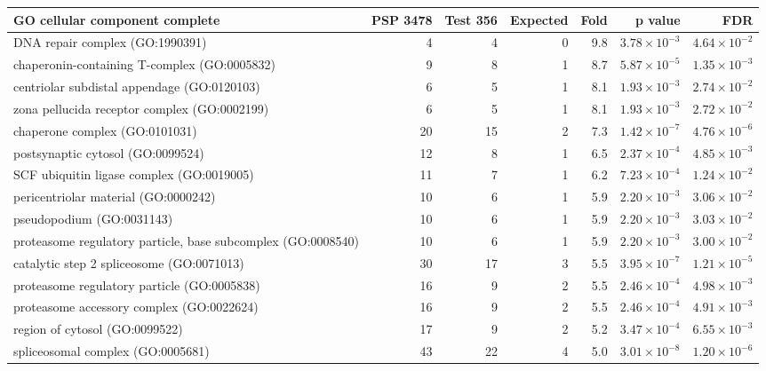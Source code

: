 \begin{table}[ht]
\centering
\begin{adjustbox}{width=\textwidth}
\begin{tabular}{lrrrrrr}
  \hline
GO cellular component complete & PSP 3478 & Test 356 & Expected & Fold & p value & FDR \\ 
  \hline
DNA repair complex (GO:1990391) & 4 & 4 & 0 & 9.8 & $3.78 \times 10^{-3}$ & $4.64 \times 10^{-2}$ \\ 
  chaperonin-containing T-complex (GO:0005832) & 9 & 8 & 1 & 8.7 & $5.87 \times 10^{-5}$ & $1.35 \times 10^{-3}$ \\ 
  centriolar subdistal appendage (GO:0120103) & 6 & 5 & 1 & 8.1 & $1.93 \times 10^{-3}$ & $2.74 \times 10^{-2}$ \\ 
  zona pellucida receptor complex (GO:0002199) & 6 & 5 & 1 & 8.1 & $1.93 \times 10^{-3}$ & $2.72 \times 10^{-2}$ \\ 
  chaperone complex (GO:0101031) & 20 & 15 & 2 & 7.3 & $1.42 \times 10^{-7}$ & $4.76 \times 10^{-6}$ \\ 
  postsynaptic cytosol (GO:0099524) & 12 & 8 & 1 & 6.5 & $2.37 \times 10^{-4}$ & $4.85 \times 10^{-3}$ \\ 
  SCF ubiquitin ligase complex (GO:0019005) & 11 & 7 & 1 & 6.2 & $7.23 \times 10^{-4}$ & $1.24 \times 10^{-2}$ \\ 
  pericentriolar material (GO:0000242) & 10 & 6 & 1 & 5.9 & $2.20 \times 10^{-3}$ & $3.06 \times 10^{-2}$ \\ 
  pseudopodium (GO:0031143) & 10 & 6 & 1 & 5.9 & $2.20 \times 10^{-3}$ & $3.03 \times 10^{-2}$ \\ 
  proteasome regulatory particle, base subcomplex (GO:0008540) & 10 & 6 & 1 & 5.9 & $2.20 \times 10^{-3}$ & $3.00 \times 10^{-2}$ \\ 
  catalytic step 2 spliceosome (GO:0071013) & 30 & 17 & 3 & 5.5 & $3.95 \times 10^{-7}$ & $1.21 \times 10^{-5}$ \\ 
  proteasome regulatory particle (GO:0005838) & 16 & 9 & 2 & 5.5 & $2.46 \times 10^{-4}$ & $4.98 \times 10^{-3}$ \\ 
  proteasome accessory complex (GO:0022624) & 16 & 9 & 2 & 5.5 & $2.46 \times 10^{-4}$ & $4.91 \times 10^{-3}$ \\ 
  region of cytosol (GO:0099522) & 17 & 9 & 2 & 5.2 & $3.47 \times 10^{-4}$ & $6.55 \times 10^{-3}$ \\ 
  spliceosomal complex (GO:0005681) & 43 & 22 & 4 & 5.0 & $3.01 \times 10^{-8}$ & $1.20 \times 10^{-6}$ \\ 

\end{tabular}
\end{adjustbox}
\end{table}
